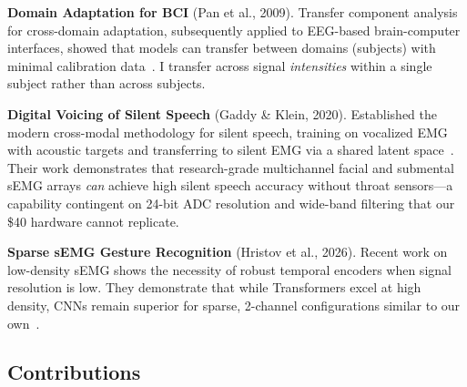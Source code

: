 \documentclass[11pt, a4paper]{article}
\begin{document}
\textbf{Domain Adaptation for BCI} (Pan et al., 2009). Transfer component analysis for cross-domain adaptation, subsequently applied to EEG-based brain-computer interfaces, showed that models can transfer between domains (subjects) with minimal calibration data~\cite{pan2011}. I transfer across signal \emph{intensities} within a single subject rather than across subjects.

\textbf{Digital Voicing of Silent Speech} (Gaddy \& Klein, 2020). Established the modern cross-modal methodology for silent speech, training on vocalized EMG with acoustic targets and transferring to silent EMG via a shared latent space~\cite{gaddy2020}. Their work demonstrates that research-grade multichannel facial and submental sEMG arrays \emph{can} achieve high silent speech accuracy without throat sensors---a capability contingent on 24-bit ADC resolution and wide-band filtering that our \$40 hardware cannot replicate.

\textbf{Sparse sEMG Gesture Recognition} (Hristov et al., 2026). Recent work on low-density sEMG shows the necessity of robust temporal encoders when signal resolution is low. They demonstrate that while Transformers excel at high density, CNNs remain superior for sparse, 2-channel configurations similar to our own~\cite{hristov2026}.

\subsection{Contributions}
\end{document}
